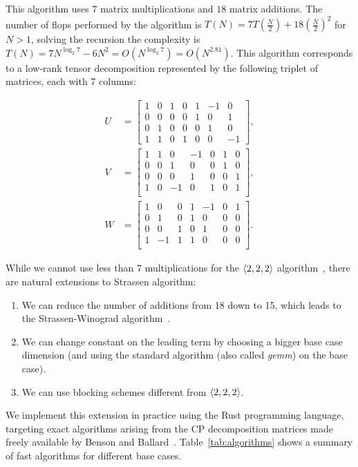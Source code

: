 \documentclass[a4paper, leqno, 11pt]{article}
\theoremstyle{definition}
\theoremstyle{remark}
\theoremstyle{experimental}
\begin{document}
This algorithm uses $ 7 $ matrix multiplications and $ 18 $ matrix additions. The number of flops
performed by the algorithm is $ T(N) = 7T(\frac{N}{2}) + 18(\frac{N}{2})^2$ for $ N>1 $, solving the
recursion the complexity is $ T(N) = 7N^{\log_2 7} - 6N^2 = O(N^{\log_2 7}) = O(N^{2.81}) $. This
algorithm corresponds to a low-rank tensor decomposition represented by the following triplet of
matrices, each with 7 columns:

\begin{align*}
U &= \begin{bmatrix}
1 & 0 & 1 & 0 & 1 & -1 & 0 \\
0 & 0 & 0 & 0 & 1 & 0 & 1 \\
0 & 1 & 0 & 0 & 0 & 1 & 0 \\
1 & 1 & 0 & 1 & 0 & 0 & -1
\end{bmatrix}, \\
V &= \begin{bmatrix}
1 & 1 & 0 & -1 & 0 & 1 & 0 \\
0 & 0 & 1 & 0 & 0 & 1 & 0 \\
0 & 0 & 0 & 1 & 0 & 0 & 1 \\
1 & 0 & -1 & 0 & 1 & 0 & 1 \\
\end{bmatrix}, \\
W &= \begin{bmatrix}
1 & 0 & 0 & 1 & -1 & 0 & 1 \\
0 & 1 & 0 & 1 & 0 & 0 & 0 \\
0 & 0 & 1 & 0 & 1 & 0 & 0 \\
1 & -1 & 1 & 1 & 0 & 0 & 0 \\
\end{bmatrix}.
\end{align*}

While we cannot use less than 7 multiplications for the $ \angb{2,2,2} $ algorithm~\cite{winograd1971},
there are natural extensions to Strassen algorithm:

\begin{enumerate}
  \item We can reduce the number of additions from 18 down to 15, which leads to the Strassen-Winograd algorithm~\cite{winograd1971}.
  \item We can change constant on the leading term by choosing a bigger base case dimension (and
    using the standard algorithm (also called \emph{gemm}) on the base case).
  \item We can use blocking schemes different from $ \angb{2,2,2} $.
\end{enumerate}
We implement this extension in practice using the Rust programming language, targeting exact
algorithms arising from the CP decomposition matrices made freely available by Benson and Ballard~\cite{bensonballard2015}. Table~\ref{tab:algorithms} shows a summary of fast
algorithms for different base cases.
\end{document}
